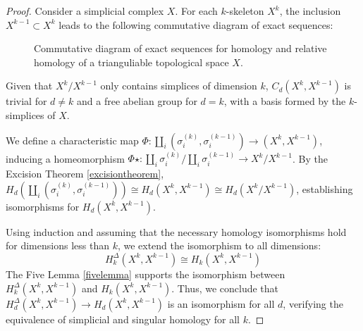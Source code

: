\begin{proof}
	Consider a simplicial complex $X$. For each $k$-skeleton $X^{k}$, the inclusion
	$X^{k-1}\subset X^{k}$ leads to the following commutative diagram of exact sequences:
	\begin{figure}[h]
		\caption{Commutative diagram of exact sequences for homology and relative
		homology of a trianguliable topological space $X$.}
	\end{figure}

	Given that $X^{k}/X^{k-1}$ only contains simplices of dimension $k$,
	$C_{d}(X^{k}, X^{k-1})$ is trivial for $d \neq k$ and a free abelian group for
	$d = k$, with a basis formed by the $k$-simplices of $X$.

	We define a characteristic map $\Phi: \coprod_{i}(\sigma^{(k)}_{i}, \sigma^{(k-1)}
	_{i}) \rightarrow (X^{k}, X^{k-1})$, inducing a homeomorphism
	$\Phi\star: \coprod_{i} \sigma^{(k)}_{i}/\coprod_{i} \sigma^{(k-1)}_{i} \rightarrow
	X^{k}/X^{k-1}$. By the Excision Theorem \ref{excisiontheorem},
	$H_{d}(\coprod_{i} (\sigma^{(k)}_{i}, \sigma^{(k-1)}_{i})) \cong H_{d}(X^{k}, X
	^{k-1}) \cong H_{d}(X^{k}/X^{k-1})$, establishing isomorphisms for $H_{d}(X^{k}
	, X^{k-1})$.

	Using induction and assuming that the necessary homology isomorphisms hold for
	dimensions less than $k$, we extend the isomorphism to all dimensions:
	\begin{equation}
		H_{k}^{\Delta}(X^{k},X^{k-1}) \cong H_{k}(X^{k},X^{k-1})
	\end{equation}
	The Five Lemma \ref{fivelemma} supports the isomorphism between $H_{k}^{\Delta}
	(X^{k}, X^{k-1})$ and $H_{k}(X^{k}, X^{k-1})$. Thus, we conclude that $H_{d}^{\Delta}
	(X^{k}, X^{k-1}) \rightarrow H_{d}(X^{k}, X^{k-1})$ is an isomorphism for all $d$,
	verifying the equivalence of simplicial and singular homology for all $k$.
\end{proof}
